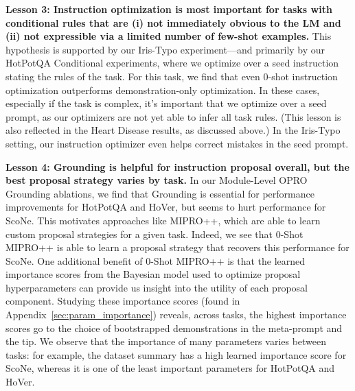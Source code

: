 \textbf{Lesson 3: Instruction optimization is most important for tasks with conditional rules that are (i) not immediately obvious to the LM and (ii) not expressible via a limited number of few-shot examples.} This hypothesis is supported by our Iris-Typo experiment---and primarily by our HotPotQA Conditional experiments, where we optimize over a seed instruction stating the rules of the task. For this task, we find that even 0-shot instruction optimization outperforms demonstration-only optimization. In these cases, especially if the task is complex, it's important that we optimize over a seed prompt, as our optimizers are not yet able to infer all task rules. (This lesson is also reflected in the Heart Disease results, as discussed above.)  In the Iris-Typo setting, our instruction optimizer even helps correct mistakes in the seed prompt. 

\textbf{Lesson 4: Grounding is helpful for instruction proposal overall, but the best proposal strategy varies by task.} 
In our Module-Level OPRO Grounding ablations, we find that Grounding is essential for performance improvements for HotPotQA and HoVer, but seems to hurt performance for ScoNe. This motivates approaches like MIPRO++, which are able to learn custom proposal strategies for a given task. Indeed, we see that 0-Shot MIPRO++ is able to learn a proposal strategy that recovers this performance for ScoNe. One additional benefit of 0-Shot MIPRO++ is that the learned importance scores from the Bayesian model used to optimize proposal hyperparameters can provide us insight into the utility of each proposal component. Studying these importance scores (found in Appendix~\ref{sec:param_importance}) reveals, across tasks, the highest importance scores go to the choice of bootstrapped demonstrations in the meta-prompt and the tip. We observe that the importance of many parameters varies between tasks: for example, the dataset summary has a high learned importance score for ScoNe, whereas it is one of the least important parameters for HotPotQA and HoVer.

